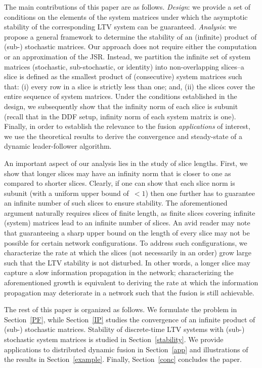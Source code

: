 \documentclass[draftclsnofoot, onecolumn, 12pt]{IEEEtran}
\begin{document}
The main contributions of this paper are as follows. \emph{Design}: we provide a set of conditions on the elements of the system matrices under which the asymptotic stability of the corresponding LTV system can be guaranteed. \emph{Analysis}: we propose a general framework to determine the stability of an (infinite) product of (sub-) stochastic matrices. Our approach does not require either the computation or an approximation of the JSR. Instead, we partition the infinite set of system matrices (stochastic, sub-stochastic, or identity) into non-overlapping slices--a slice is defined as the smallest product of (consecutive) system matrices such that: (i) every row in a slice is strictly less than one; and, (ii) the slices cover the entire sequence of system matrices. Under the conditions established in the design, we subsequently show that the infinity norm of each slice is subunit (recall that in the DDF setup, infinity norm of each system matrix is one). Finally, in order to establish the relevance to the fusion \textit{applications} of interest, we use the theoretical results to derive the convergence and steady-state of a dynamic leader-follower algorithm. 

An important aspect of our analysis lies in the study of slice lengths. First, we show that longer slices may have an infinity norm that is closer to one as compared to shorter slices. Clearly, if one can show that each slice norm is subunit (with a uniform upper bound of~$<1$) then one further has to guarantee an infinite number of such slices to ensure stability. The aforementioned argument naturally requires slices of finite length, as finite slices covering infinite (system) matrices lead to an infinite number of slices. An avid reader may note that guaranteeing a sharp upper bound on the length of every slice may not be possible for certain network configurations. To address such configurations, we characterize the rate at which the slices (not necessarily in an order) grow large such that the LTV stability is not disturbed. In other words, a longer slice may capture a slow information propagation in the network; characterizing the aforementioned growth is equivalent to deriving the rate at which the information propagation may deteriorate in a network such that the fusion is still achievable. 

The rest of this paper is organized as follows. We formulate the problem in Section~\ref{PF}, while Section~\ref{IP} studies the convergence of an infinite product of (sub-) stochastic matrices. Stability of discrete-time LTV systems with (sub-) stochastic system matrices is studied in Section~\ref{stability}. We provide applications to distributed dynamic fusion in Section~\ref{app} and illustrations of the results in Section~\ref{example}. Finally, Section~\ref{conc} concludes the paper.
\end{document}
